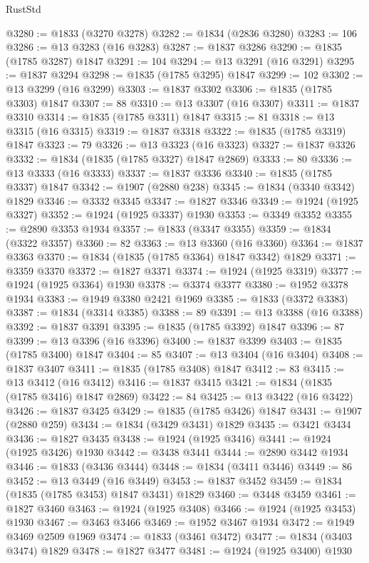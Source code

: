 \begin{lexlean}{RustStd}
\begin{coremodule}
@3280 := @1833 (@3270 @3278)
@3282 := @1834 (@2836 @3280)
@3283 := 106
@3286 := @13 @3283 (@16 @3283)
@3287 := @1837 @3286
@3290 := @1835 (@1785 @3287) @1847
@3291 := 104
@3294 := @13 @3291 (@16 @3291)
@3295 := @1837 @3294
@3298 := @1835 (@1785 @3295) @1847
@3299 := 102
@3302 := @13 @3299 (@16 @3299)
@3303 := @1837 @3302
@3306 := @1835 (@1785 @3303) @1847
@3307 := 88
@3310 := @13 @3307 (@16 @3307)
@3311 := @1837 @3310
@3314 := @1835 (@1785 @3311) @1847
@3315 := 81
@3318 := @13 @3315 (@16 @3315)
@3319 := @1837 @3318
@3322 := @1835 (@1785 @3319) @1847
@3323 := 79
@3326 := @13 @3323 (@16 @3323)
@3327 := @1837 @3326
@3332 := @1834 (@1835 (@1785 @3327) @1847 @2869)
@3333 := 80
@3336 := @13 @3333 (@16 @3333)
@3337 := @1837 @3336
@3340 := @1835 (@1785 @3337) @1847
@3342 := @1907 (@2880 @238)
@3345 := @1834 (@3340 @3342) @1829
@3346 := @3332 @3345
@3347 := @1827 @3346
@3349 := @1924 (@1925 @3327)
@3352 := @1924 (@1925 @3337) @1930
@3353 := @3349 @3352
@3355 := @2890 @3353 @1934
@3357 := @1833 (@3347 @3355)
@3359 := @1834 (@3322 @3357)
@3360 := 82
@3363 := @13 @3360 (@16 @3360)
@3364 := @1837 @3363
@3370 := @1834 (@1835 (@1785 @3364) @1847 @3342) @1829
@3371 := @3359 @3370
@3372 := @1827 @3371
@3374 := @1924 (@1925 @3319)
@3377 := @1924 (@1925 @3364) @1930
@3378 := @3374 @3377
@3380 := @1952 @3378 @1934
@3383 := @1949 @3380 @2421 @1969
@3385 := @1833 (@3372 @3383)
@3387 := @1834 (@3314 @3385)
@3388 := 89
@3391 := @13 @3388 (@16 @3388)
@3392 := @1837 @3391
@3395 := @1835 (@1785 @3392) @1847
@3396 := 87
@3399 := @13 @3396 (@16 @3396)
@3400 := @1837 @3399
@3403 := @1835 (@1785 @3400) @1847
@3404 := 85
@3407 := @13 @3404 (@16 @3404)
@3408 := @1837 @3407
@3411 := @1835 (@1785 @3408) @1847
@3412 := 83
@3415 := @13 @3412 (@16 @3412)
@3416 := @1837 @3415
@3421 := @1834 (@1835 (@1785 @3416) @1847 @2869)
@3422 := 84
@3425 := @13 @3422 (@16 @3422)
@3426 := @1837 @3425
@3429 := @1835 (@1785 @3426) @1847
@3431 := @1907 (@2880 @259)
@3434 := @1834 (@3429 @3431) @1829
@3435 := @3421 @3434
@3436 := @1827 @3435
@3438 := @1924 (@1925 @3416)
@3441 := @1924 (@1925 @3426) @1930
@3442 := @3438 @3441
@3444 := @2890 @3442 @1934
@3446 := @1833 (@3436 @3444)
@3448 := @1834 (@3411 @3446)
@3449 := 86
@3452 := @13 @3449 (@16 @3449)
@3453 := @1837 @3452
@3459 := @1834 (@1835 (@1785 @3453) @1847 @3431) @1829
@3460 := @3448 @3459
@3461 := @1827 @3460
@3463 := @1924 (@1925 @3408)
@3466 := @1924 (@1925 @3453) @1930
@3467 := @3463 @3466
@3469 := @1952 @3467 @1934
@3472 := @1949 @3469 @2509 @1969
@3474 := @1833 (@3461 @3472)
@3477 := @1834 (@3403 @3474) @1829
@3478 := @1827 @3477
@3481 := @1924 (@1925 @3400) @1930

\end{coremodule}
\end{lexlean}
